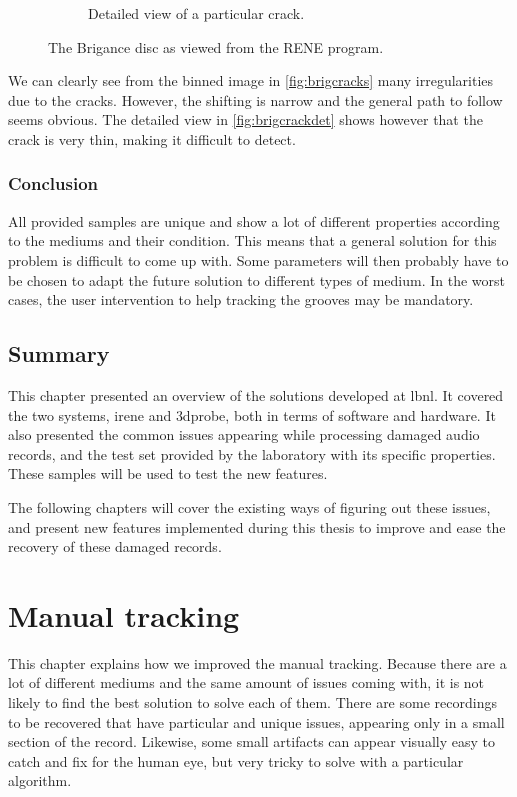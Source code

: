 \begin{figure}[!ht]
\begin{subfigure}[t]{0.45\textwidth}
    \caption{Detailed view of a particular crack.}
    \label{fig:brigcrackdet}
    \end{subfigure}
    \caption{The Brigance disc as viewed from the RENE program.}
    \label{fig:brigdamage}
\end{figure}

We can clearly see from the binned image in \autoref{fig:brigcracks} many irregularities due to the cracks. However, the shifting is narrow and the general path to follow seems obvious. The detailed view in \autoref{fig:brigcrackdet} shows however that the crack is very thin, making it difficult to detect.

\subsection{Conclusion}

All provided samples are unique and show a lot of different properties according to the mediums and their condition. This means that a general solution for this problem is difficult to come up with. Some parameters will then probably have to be chosen to adapt the future solution to different types of medium. In the worst cases, the user intervention to help tracking the grooves may be mandatory.

\section{Summary}

This chapter presented an overview of the solutions developed at \gls{lbnl}. It covered the two systems, \gls{irene} and \gls{3dprobe}, both in terms of software and hardware. It also presented the common issues appearing while processing damaged audio records, and the test set provided by the laboratory with its specific properties. These samples will be used to test the new features.

The following chapters will cover the existing ways of figuring out these issues, and present new features implemented during this thesis to improve and ease the recovery of these damaged records.

\chapter{Manual tracking}
\label{chap:mantrack}

This chapter explains how we improved the manual tracking. Because there are a lot of different mediums and the same amount of issues coming with, it is not likely to find the best solution to solve each of them. There are some recordings to be recovered that have particular and unique issues, appearing only in a small section of the record. Likewise, some small artifacts can appear visually easy to catch and fix for the human eye, but very tricky to solve with a particular algorithm.

